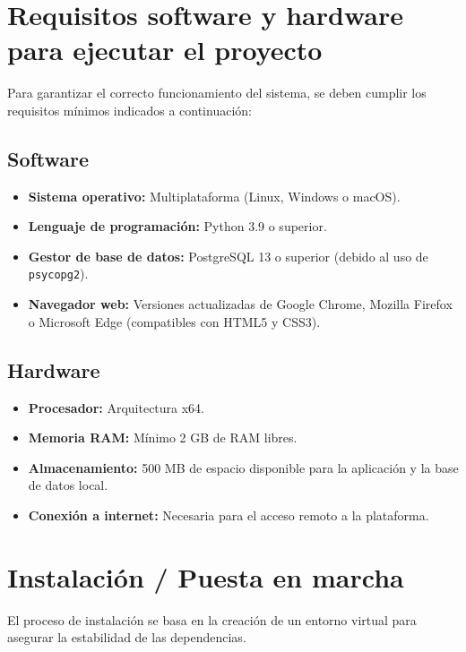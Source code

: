 
\section{Requisitos software y hardware para ejecutar el proyecto}
Para garantizar el correcto funcionamiento del sistema, se deben cumplir los requisitos mínimos indicados a continuación:

\subsection{Software}
\begin{itemize}
	\item \textbf{Sistema operativo:} Multiplataforma (Linux, Windows o macOS).
	\item \textbf{Lenguaje de programación:} Python 3.9 o superior.
	\item \textbf{Gestor de base de datos:} PostgreSQL 13 o superior (debido al uso de \texttt{psycopg2}).
	\item \textbf{Navegador web:} Versiones actualizadas de Google Chrome, Mozilla Firefox o Microsoft Edge (compatibles con HTML5 y CSS3).
\end{itemize}

\subsection{Hardware}
\begin{itemize}
    \item \textbf{Procesador:} Arquitectura x64.
    \item \textbf{Memoria RAM:} Mínimo 2 GB de RAM libres.
    \item \textbf{Almacenamiento:} 500 MB de espacio disponible para la aplicación y la base de datos local.
    \item \textbf{Conexión a internet:} Necesaria para el acceso remoto a la plataforma.
\end{itemize}

\section{Instalación / Puesta en marcha}
El proceso de instalación se basa en la creación de un entorno virtual para asegurar la estabilidad de las dependencias.

